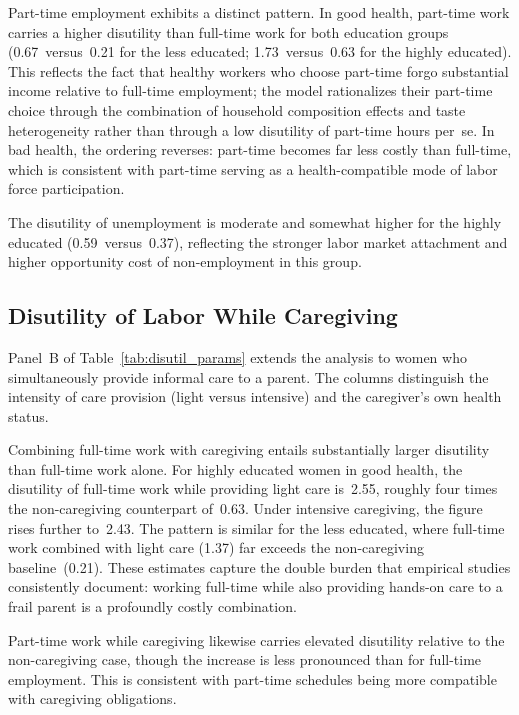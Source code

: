 Part-time employment exhibits a distinct pattern.  In good health,
part-time work carries a higher disutility than full-time work for both
education groups (0.67~versus~0.21 for the less educated; 1.73~versus~0.63
for the highly educated).  This reflects the fact that healthy workers
who choose part-time forgo substantial income relative to full-time
employment; the model rationalizes their part-time choice through the
combination of household composition effects and taste heterogeneity
rather than through a low disutility of part-time hours per~se.  In bad
health, the ordering reverses: part-time becomes far less costly than
full-time, which is consistent with part-time serving as a
health-compatible mode of labor force participation.

The disutility of unemployment is moderate and somewhat higher for the
highly educated (0.59~versus~0.37), reflecting the stronger labor market
attachment and higher opportunity cost of non-employment in this group.


\subsection{Disutility of Labor While Caregiving}
\label{sec:results_disutil_care}

Panel~B of Table~\ref{tab:disutil_params} extends the analysis to women
who simultaneously provide informal care to a parent.  The columns
distinguish the intensity of care provision (light versus intensive) and
the caregiver's own health status.

Combining full-time work with caregiving entails substantially larger
disutility than full-time work alone.  For highly educated women in good
health, the disutility of full-time work while providing light care
is~2.55, roughly four times the non-caregiving counterpart of~0.63.
Under intensive caregiving, the figure rises further to~2.43.  The
pattern is similar for the less educated, where full-time work combined
with light care (1.37) far exceeds the non-caregiving
baseline~(0.21).  These estimates capture the double burden that
empirical studies consistently document: working full-time while also
providing hands-on care to a frail parent is a profoundly costly
combination.

Part-time work while caregiving likewise carries elevated disutility
relative to the non-caregiving case, though the increase is less
pronounced than for full-time employment.  This is consistent with
part-time schedules being more compatible with caregiving obligations.

